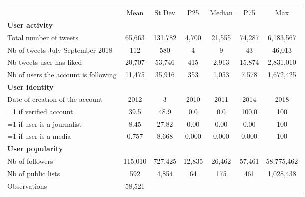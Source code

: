 {
\def\sym#1{\ifmmode^{#1}\else\(^{#1}\)\fi}
\begin{tabular}{l*{1}{cccccc}}
\hline\hline
                    &\multicolumn{6}{c}{}                                                         \\
                    &        Mean&      St.Dev&         P25&      Median&         P75&         Max\\
\hline
\textbf{User activity}&            &            &            &            &            &            \\
Total number of tweets&      65,663&     131,782&       4,700&      21,555&      74,287&   6,183,567\\
Nb of tweets July-September 2018&         112&         580&           4&           9&          43&      46,013\\
Nb tweets user has liked&      20,707&      53,746&         415&       2,913&      15,874&   2,831,010\\
Nb of users the account is following&      11,475&      35,916&         353&       1,053&       7,578&   1,672,425\\
\textbf{User identity}&            &            &            &            &            &            \\
Date of creation of the account&        2012&           3&        2010&        2011&        2014&        2018\\
=1 if verified account&        39.5&        48.9&         0.0&         0.0&       100.0&         100\\
=1 if user is a journalist&        8.45&       27.82&        0.00&        0.00&        0.00&         100\\
=1 if user is a media&       0.757&       8.668&       0.000&       0.000&       0.000&         100\\
\textbf{User popularity}&            &            &            &            &            &            \\
Nb of followers     &     115,010&     727,425&      12,835&      26,462&      57,461&  58,775,462\\
Nb of public lists  &         592&       4,854&          64&         175&         461&   1,028,438\\
\hline
Observations        &      58,521&            &            &            &            &            \\
\hline\hline
\end{tabular}
}
